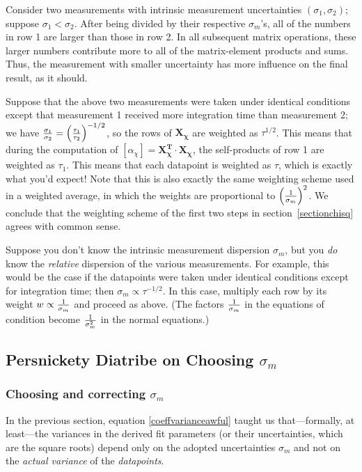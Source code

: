 \documentclass[psfig,preprint]{aastex}
\begin{document}
	Consider two measurements with intrinsic measurement
uncertainties $(\sigma_{1}, \sigma_{2})$; suppose
$\sigma_{1} < \sigma_{2}$.  After being divided by their
respective $\sigma_{m}$'s, all of the numbers in row 1 are larger
than those in row 2.  In all subsequent matrix operations, these larger
numbers contribute more to all of the matrix-element products and sums. 
Thus, the measurement with smaller uncertainty has more influence on the
final result, as it should. 

	Suppose that the above two measurements were taken under
identical conditions except that measurement 1 received more integration
time than measurement 2; we have ${\sigma_{1} \over \sigma_{2}} =
\left({\tau_1 \over \tau_2}\right)^{-1/2}$, so the rows of $\mathbf
{X_\chi}$ are weighted as $\tau^{1/2}$.  This means that during the
computation of $[\alpha_\chi] = \mathbf {X_\chi^T \cdot X_\chi}$, the
self-products of row 1 are weighted as $\tau_1$.  This means that each
datapoint is weighted as $\tau$, which is exactly what you'd expect!
Note that this is also exactly the same weighting scheme used in a
weighted average, in which the weights are proportional to $\left(1
\over \sigma_{m}\right)^2$.  We conclude that the weighting scheme of
the first two steps in section~\ref{sectionchisq} agrees with common
sense. 

	Suppose you don't know the intrinsic measurement dispersion
$\sigma_{m}$, but you {\it do} know the {\it relative} dispersion of
the various measurements.  For example, this would be the case if the
datapoints were taken under identical conditions except for integration
time; then $\sigma_{m} \propto \tau^{-1/2}$.  In this case, multiply
each row by its weight $w \propto {1 \over \sigma_{m}}$ and proceed
as above. (The factors ${1 \over \sigma_{m}}$ in the equations of
condition become ${1 \over \sigma_{m}^2}$ in the normal equations.)

\subsection{ Persnickety Diatribe on Choosing $\sigma_{m}$ }
\label{diatribe} 

\subsubsection{Choosing and correcting $\sigma_{m}$}

\label{diatrabeone}

	In the previous section, equation \ref{coeffvarianceawful}
taught us that---formally, at least---the variances in the derived fit
parameters (or their uncertainties, which are the square roots) depend
only on the adopted uncertainties $\sigma_{m}$ and not on the {\it
actual variance} of the {\it datapoints}. 
\end{document}
